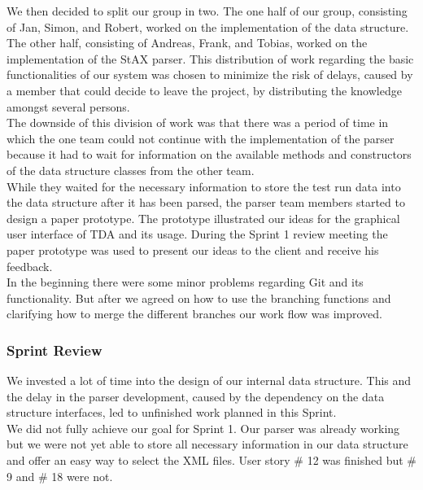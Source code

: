We then decided to split our group in two. The one half of our group, consisting of Jan, Simon, and Robert, worked on the implementation of the data structure. The other half, consisting of Andreas, Frank, and Tobias, worked on the implementation of the StAX parser. This distribution of work regarding the basic functionalities of our system was chosen to minimize the risk of delays, caused by a member that could decide to leave the project, by distributing the knowledge amongst several persons. \\ 

The downside of this division of work was that there was a period of time in which the one team could not continue with the implementation of the parser because it had to wait for information on the available methods and constructors of the data structure classes from the other team. \\ 

While they waited for the necessary information to store the test run data into the data structure after it has been parsed, the parser team members started to design a paper prototype. The prototype illustrated our ideas for the graphical user interface of TDA and its usage. During the Sprint 1 review meeting the paper prototype was used to present our ideas to the client and receive his feedback. \\ 

In the beginning there were some minor problems regarding Git and its functionality. But after we agreed on how to use the branching functions and clarifying how to merge the different branches our work flow was improved. \\ 


\subsubsection*{Sprint Review}

We invested a lot of time into the design of our internal data structure. This and the delay in the parser development, caused by the dependency on the data structure interfaces, led to unfinished work planned in this Sprint. \\

We did not fully achieve our goal for Sprint 1. Our parser was already working but we were not yet able to store all necessary information in our data structure and offer an easy way to select the XML files. User story \# 12 was finished but \# 9 and \# 18 were not. \\ 

